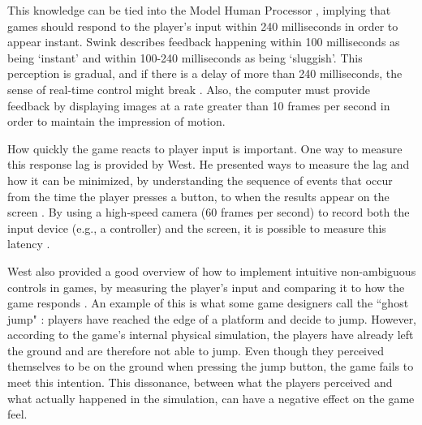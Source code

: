 This knowledge can be tied into the Model Human Processor \cite{card1986model, swink}, implying that games should respond to the player's input within 240 milliseconds in order to appear instant. Swink describes feedback happening within 100 milliseconds as being `instant' and within 100-240 milliseconds as being `sluggish'. This perception is gradual, and if there is a delay of more than 240 milliseconds, the sense of real-time control might break \cite{swink}. Also, the computer must provide feedback by displaying images at a rate greater than 10 frames per second in order to maintain the impression of motion.

How quickly the game reacts to player input is important. One way to measure this response lag is provided by West. He presented ways to measure the lag and how it can be minimized, by understanding the sequence of events that occur from the time the player presses a button, to when the results appear on the screen \cite{measure_lag, program_lag}. By using a high-speed camera (60 frames per second) to record both the input device (e.g., a controller) and the screen, it is possible to measure this latency \cite{euro}.


West also provided a good overview of how to implement intuitive non-ambiguous controls in games, by measuring the player's input and comparing it to how the game responds \cite{intuitive_buttons}. An example of this is what some game designers call the ``ghost jump" \cite{ghostJump, canabalt}: players have reached the edge of a platform and decide to jump. However, according to the game's internal physical simulation, the players have already left the ground and are therefore not able to jump. Even though they perceived themselves to be on the ground when pressing the jump button, the game fails to meet this intention. This dissonance, between what the players perceived and what actually happened in the simulation, can have a negative effect on the game feel.


